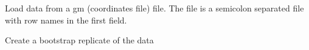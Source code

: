 \documentclass[letterpaper,10pt,english]{sphinxmanual}
\begin{document}
\begin{fulllineitems}
\begin{fulllineitems}
\end{fulllineitems}


\begin{fulllineitems}
\label{Doc:Moduler.GMdata.Read_GM}
Load data from a gm (coordinates file) file. The file is a semicolon separated file
with row names in the first field.

\end{fulllineitems}


\begin{fulllineitems}
\label{Doc:Moduler.GMdata.bootstrap_replicate}
Create a bootstrap replicate of the data

\end{fulllineitems}


\end{fulllineitems}

\end{document}
